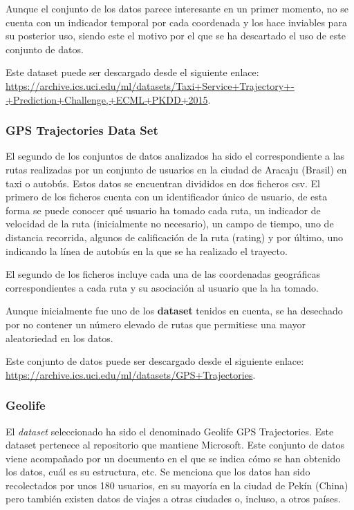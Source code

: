 Aunque el conjunto de los datos parece interesante en un primer momento, no se cuenta con un indicador temporal por cada coordenada y los hace inviables para su posterior uso, siendo este el motivo por el que se ha descartado el uso de este conjunto de datos.

Este dataset puede ser descargado desde el siguiente enlace: \url{https://archive.ics.uci.edu/ml/datasets/Taxi+Service+Trajectory+-+Prediction+Challenge,+ECML+PKDD+2015}.

\subsubsection{GPS Trajectories Data Set}
El segundo de los conjuntos de datos analizados ha sido el correspondiente a las rutas realizadas por un conjunto de usuarios en la ciudad de Aracaju (Brasil) en taxi o autobús. Estos datos se encuentran divididos en dos ficheros csv. El primero de los ficheros cuenta con un identificador único de usuario, de esta forma se puede conocer qué usuario ha tomado cada ruta, un indicador de velocidad de la ruta (inicialmente no necesario), un campo de tiempo, uno de distancia recorrida, algunos de calificación de la ruta (rating) y por último, uno indicando la línea de autobús en la que se ha realizado el trayecto.

El segundo de los ficheros incluye cada una de las coordenadas geográficas correspondientes a cada ruta y su asociación al usuario que la ha tomado.

Aunque inicialmente fue uno de los \textbf{dataset} tenidos en cuenta, se ha desechado por no contener un número elevado de rutas que permitiese una mayor aleatoriedad en los datos.

Este conjunto de datos puede ser descargado desde el siguiente enlace: \url{https://archive.ics.uci.edu/ml/datasets/GPS+Trajectories}.

\subsubsection{Geolife}
El \textit{dataset} seleccionado ha sido el denominado Geolife GPS Trajectories. Este dataset pertenece al repositorio que mantiene Microsoft. Este conjunto de datos viene acompañado por un documento en el que se indica cómo se han obtenido los datos, cuál es su estructura, etc. Se menciona que los datos han sido recolectados por unos 180 usuarios, en su mayoría en la ciudad de Pekín (China) pero también existen datos de viajes a otras ciudades o, incluso, a otros países.

